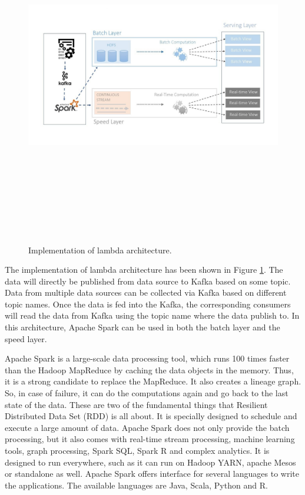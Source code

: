 \begin{figure}[htpb]
	\centering
	\includegraphics[width=17cm,height=15cm,keepaspectratio=true]{images/imp_lambda_arc}
	\caption{
		Implementation of lambda architecture.
	}
	\label{fig:impl_lambda_arc}
\end{figure}


The implementation of lambda architecture has been shown in Figure \ref{fig:impl_lambda_arc}. The data will directly be published from data source to Kafka based on some topic. Data from multiple data sources can be collected via Kafka based on different topic names. Once the data is fed into the Kafka, the corresponding consumers will read the data from Kafka using the topic name where the data publish to. In this architecture, Apache Spark can be used in both the batch layer and the speed layer. 

Apache Spark is a large-scale data processing tool, which runs 100 times faster than the Hadoop MapReduce by caching the data objects in the memory. Thus, it is a strong candidate to replace the MapReduce. It also creates a lineage graph. So, in case of failure, it can do the computations again and go back to the last state of the data. These are two of the fundamental things that Resilient Distributed Data Set (RDD) is all about. It is specially designed to schedule and execute a large amount of data. Apache Spark does not only provide the batch processing, but it also comes with real-time stream processing, machine learning tools, graph processing, Spark SQL, Spark R and complex analytics. It is designed to run everywhere, such as it can run on Hadoop YARN, apache Mesos or standalone as well. Apache Spark offers interface for several languages to write the applications. The available languages are Java, Scala, Python and R.



